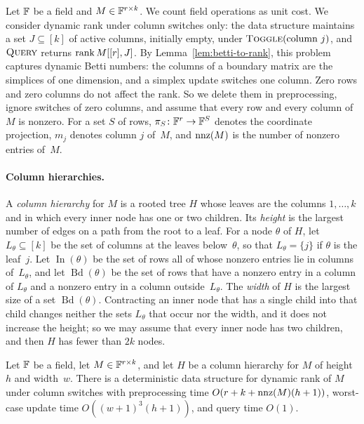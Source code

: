 Let $\mathbb{F}$ be a field and $M\in\mathbb{F}^{r\times k}$.
We count field operations as unit cost.
We consider dynamic rank under column switches only: the data structure maintains a set $J\subseteq[k]$ of active columns, initially empty, under $\textsc{Toggle}(\text{column }j)$, and $\textsc{Query}$ returns $\operatorname{rank} M[[r],J]$.
By Lemma~\ref{lem:betti-to-rank}, this problem captures dynamic Betti numbers: the columns of a boundary matrix are the simplices of one dimension, and a simplex update switches one column.
Zero rows and zero columns do not affect the rank.
So we delete them in preprocessing, ignore switches of zero columns, and assume that every row and every column of $M$ is nonzero.
For a set $S$ of rows, $\pi_S\colon\mathbb{F}^r\to\mathbb{F}^S$ denotes the coordinate projection, $m_j$ denotes column $j$ of~$M$, and $\operatorname{nnz}(M)$ is the number of nonzero entries of~$M$.

\paragraph{Column hierarchies.}
A \emph{column hierarchy} for $M$ is a rooted tree $H$ whose leaves are the columns $1,\dots,k$ and in which every inner node has one or two children.
Its \emph{height} is the largest number of edges on a path from the root to a leaf.
For a node $\theta$ of $H$, let $L_\theta\subseteq[k]$ be the set of columns at the leaves below~$\theta$, so that $L_\theta=\{j\}$ if $\theta$ is the leaf~$j$.
Let $\operatorname{In}(\theta)$ be the set of rows all of whose nonzero entries lie in columns of~$L_\theta$, and let $\operatorname{Bd}(\theta)$ be the set of rows that have a nonzero entry in a column of $L_\theta$ and a nonzero entry in a column outside~$L_\theta$.
The \emph{width} of $H$ is the largest size of a set $\operatorname{Bd}(\theta)$.
Contracting an inner node that has a single child into that child changes neither the sets $L_\theta$ that occur nor the width, and it does not increase the height; so we may assume that every inner node has two children, and then $H$ has fewer than $2k$ nodes.

\begin{theorem}\label{thm:hier}
Let $\mathbb{F}$ be a field, let $M\in\mathbb{F}^{r\times k}$, and let $H$ be a column hierarchy for $M$ of height $h$ and width~$w$.
There is a deterministic data structure for dynamic rank of $M$ under column switches with preprocessing time $O(r+k+\operatorname{nnz}(M)(h+1))$, worst-case update time $O((w+1)^3(h+1))$, and query time $O(1)$.
\end{theorem}

